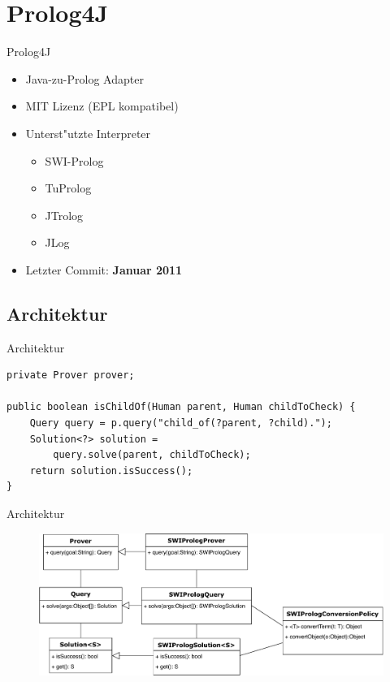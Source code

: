 \documentclass[18pt]{beamer}
\begin{document}
\section{Prolog4J}
\begin{frame}{Prolog4J}
\begin{itemize}
\item Java-zu-Prolog Adapter
\item MIT Lizenz (EPL kompatibel)
\item Unterst"utzte Interpreter
\begin{itemize}
\item SWI-Prolog
\item TuProlog
\item JTrolog
\item JLog
\end{itemize}
\item Letzter Commit: \textbf{Januar 2011}
\end{itemize}
\end{frame}
\subsection{Architektur}
\begin{frame}[fragile]{Architektur}
\begin{verbatim}
private Prover prover;

public boolean isChildOf(Human parent, Human childToCheck) {
    Query query = p.query("child_of(?parent, ?child).");
    Solution<?> solution = 
        query.solve(parent, childToCheck);
    return solution.isSuccess();
}
\end{verbatim}
\end{frame}
\begin{frame}{Architektur}
\begin{figure}[h]
\centering
\includegraphics[width=1\textwidth]{prolog4j.pdf}
\end{figure}
\end{frame}
\end{document}
